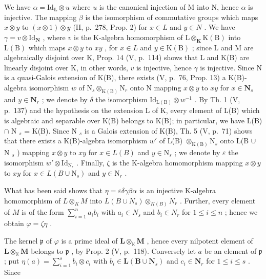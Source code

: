 We have \(\alpha = \mathrm{Id}_{\mathbf{L}} \otimes u\) where \(u\) is the canonical injection of M into N, hence \(\alpha\) is injective. The mapping \(\beta\) is the isomorphism of commutative groups which maps \(x \otimes y\) to \((x \otimes 1) \otimes y\) (II, p.~278, Prop. 2) for \(x \in L\) and \(y \in N\) . We have \(\gamma = v \otimes \mathrm{Id}_{\mathbf{N}}\) , where \(v\) is the K-algebra homomorphism of \(\mathrm{L} \otimes_{\mathbf{K}} \mathrm{K}(\mathrm{B})\) into \(\mathrm{L}(\mathrm{B})\) which maps \(x \otimes y\) to \(xy\) , for \(x \in L\) and \(y \in \mathrm{K}(\mathrm{B})\) ; since L and M are algebraically disjoint over K, Prop. 14 (V, p.~114) shows that L and K(B) are linearly disjoint over K, in other words, \(v\) is injective, hence \(\gamma\) is injective. Since N is a quasi-Galois extension of K(B), there exists (V, p.~76, Prop. 13) a K(B)-algebra isomorphism \(w\) of \(\mathrm{N}_s \otimes_{\mathrm{K}(\mathrm{B})} \mathrm{N}_r\) onto N mapping \(x \otimes y\) to \(xy\) for \(x \in \mathbf{N}_s\) and \(y \in \mathbf{N}_r\) ; we denote by \(\delta\) the isomorphism \(\mathrm{Id}_{\mathrm{L(B)}} \otimes w^{-1}\) . By Th. 1 (V, p.~137) and the hypothesis on the extension L of K, every element of L(B) which is algebraic and separable over K(B) belongs to K(B); in particular, we have L(B) \(\cap\) N \(_s\) = K(B). Since N \(_s\) is a Galois extension of K(B), Th. 5 (V, p.~71) shows that there exists a K(B)-algebra isomorphism \(w'\) of L(B) \(\otimes_{\mathrm{K(B)}} \mathrm{N}_s\) onto L(B \(\cup\) N \(_s\) ) mapping \(x \otimes y\) to \(xy\) for \(x \in L(B)\) and \(y \in \mathrm{N}_s\) ; we denote by \(\varepsilon\) the isomorphism \(w' \otimes \mathrm{Id}_{\mathrm{N}_r}\) . Finally, \(\zeta\) is the K-algebra homomorphism mapping \(x \otimes y\) to \(xy\) for \(x \in L(B \cup \mathrm{N}_s)\) and \(y \in \mathrm{N}_r\) .

What has been said shows that \(\eta = \varepsilon \delta \gamma \beta \alpha\) is an injective K-algebra homomorphism of \(L \otimes_{K} M\) into \(L(B \cup N_s) \otimes_{K(B)} N_r\) . Further, every element of \(M\) is of the form \(\sum_{i=1}^{n} a_i b_i\) with \(a_i \in N_s\) and \(b_i \in N_r\) for \(1 \leqslant i \leqslant n\) ; hence we obtain \(\varphi = \zeta \eta\) .

The kernel \(\mathfrak{p}\) of \(\varphi\) is a prime ideal of \(\mathbf{L} \otimes_{\mathbb{K}} \mathbf{M}\) , hence every nilpotent element of \(\mathbf{L} \otimes_{\mathbb{K}} \mathbf{M}\) belongs to \(\mathfrak{p}\) , by Prop. 2 (V, p.~118). Conversely let \(a\) be an element of \(\mathfrak{p}\) ; put \(\eta(a) = \sum_{i=1}^{s} b_i \otimes c_i\) with \(b_i \in \mathbf{L}(\mathbf{B} \cup \mathbf{N}_s)\) and \(c_i \in \mathbf{N}_r\) for \(1 \leqslant i \leqslant s\) . Since

